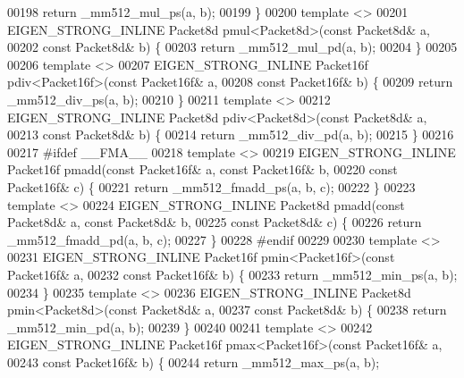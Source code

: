 \begin{DoxyCode}
00198   \textcolor{keywordflow}{return} \_mm512\_mul\_ps(a, b);
00199 \}
00200 \textcolor{keyword}{template} <>
00201 EIGEN\_STRONG\_INLINE Packet8d pmul<Packet8d>(\textcolor{keyword}{const} Packet8d& a,
00202                                             \textcolor{keyword}{const} Packet8d& b) \{
00203   \textcolor{keywordflow}{return} \_mm512\_mul\_pd(a, b);
00204 \}
00205 
00206 \textcolor{keyword}{template} <>
00207 EIGEN\_STRONG\_INLINE Packet16f pdiv<Packet16f>(\textcolor{keyword}{const} Packet16f& a,
00208                                               \textcolor{keyword}{const} Packet16f& b) \{
00209   \textcolor{keywordflow}{return} \_mm512\_div\_ps(a, b);
00210 \}
00211 \textcolor{keyword}{template} <>
00212 EIGEN\_STRONG\_INLINE Packet8d pdiv<Packet8d>(\textcolor{keyword}{const} Packet8d& a,
00213                                             \textcolor{keyword}{const} Packet8d& b) \{
00214   \textcolor{keywordflow}{return} \_mm512\_div\_pd(a, b);
00215 \}
00216 
00217 \textcolor{preprocessor}{#ifdef \_\_FMA\_\_}
00218 \textcolor{keyword}{template} <>
00219 EIGEN\_STRONG\_INLINE Packet16f pmadd(\textcolor{keyword}{const} Packet16f& a, \textcolor{keyword}{const} Packet16f& b,
00220                                     \textcolor{keyword}{const} Packet16f& c) \{
00221   \textcolor{keywordflow}{return} \_mm512\_fmadd\_ps(a, b, c);
00222 \}
00223 \textcolor{keyword}{template} <>
00224 EIGEN\_STRONG\_INLINE Packet8d pmadd(\textcolor{keyword}{const} Packet8d& a, \textcolor{keyword}{const} Packet8d& b,
00225                                    \textcolor{keyword}{const} Packet8d& c) \{
00226   \textcolor{keywordflow}{return} \_mm512\_fmadd\_pd(a, b, c);
00227 \}
00228 \textcolor{preprocessor}{#endif}
00229 
00230 \textcolor{keyword}{template} <>
00231 EIGEN\_STRONG\_INLINE Packet16f pmin<Packet16f>(\textcolor{keyword}{const} Packet16f& a,
00232                                               \textcolor{keyword}{const} Packet16f& b) \{
00233   \textcolor{keywordflow}{return} \_mm512\_min\_ps(a, b);
00234 \}
00235 \textcolor{keyword}{template} <>
00236 EIGEN\_STRONG\_INLINE Packet8d pmin<Packet8d>(\textcolor{keyword}{const} Packet8d& a,
00237                                             \textcolor{keyword}{const} Packet8d& b) \{
00238   \textcolor{keywordflow}{return} \_mm512\_min\_pd(a, b);
00239 \}
00240 
00241 \textcolor{keyword}{template} <>
00242 EIGEN\_STRONG\_INLINE Packet16f pmax<Packet16f>(\textcolor{keyword}{const} Packet16f& a,
00243                                               \textcolor{keyword}{const} Packet16f& b) \{
00244   \textcolor{keywordflow}{return} \_mm512\_max\_ps(a, b);

\end{DoxyCode}
